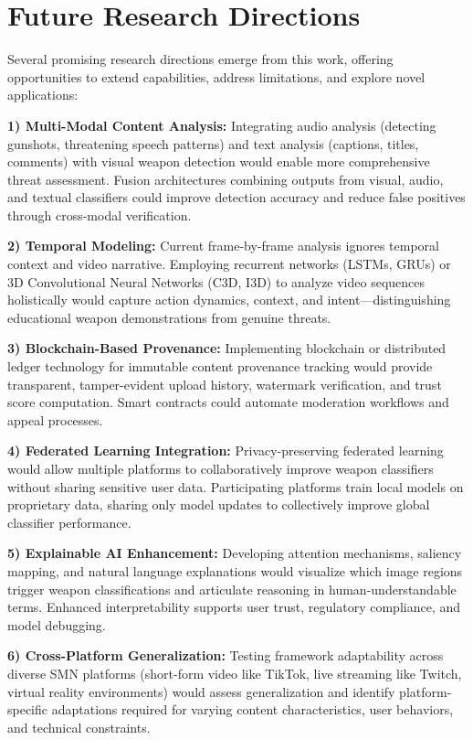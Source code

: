 \documentclass[conference]{IEEEtran}
\begin{document}
\section{Future Research Directions}

Several promising research directions emerge from this work, offering opportunities to extend capabilities, address limitations, and explore novel applications:

\textbf{1) Multi-Modal Content Analysis:} Integrating audio analysis (detecting gunshots, threatening speech patterns) and text analysis (captions, titles, comments) with visual weapon detection would enable more comprehensive threat assessment. Fusion architectures combining outputs from visual, audio, and textual classifiers could improve detection accuracy and reduce false positives through cross-modal verification.

\textbf{2) Temporal Modeling:} Current frame-by-frame analysis ignores temporal context and video narrative. Employing recurrent networks (LSTMs, GRUs) or 3D Convolutional Neural Networks (C3D, I3D) to analyze video sequences holistically would capture action dynamics, context, and intent—distinguishing educational weapon demonstrations from genuine threats.

\textbf{3) Blockchain-Based Provenance:} Implementing blockchain or distributed ledger technology for immutable content provenance tracking would provide transparent, tamper-evident upload history, watermark verification, and trust score computation. Smart contracts could automate moderation workflows and appeal processes.

\textbf{4) Federated Learning Integration:} Privacy-preserving federated learning would allow multiple platforms to collaboratively improve weapon classifiers without sharing sensitive user data. Participating platforms train local models on proprietary data, sharing only model updates to collectively improve global classifier performance.

\textbf{5) Explainable AI Enhancement:} Developing attention mechanisms, saliency mapping, and natural language explanations would visualize which image regions trigger weapon classifications and articulate reasoning in human-understandable terms. Enhanced interpretability supports user trust, regulatory compliance, and model debugging.

\textbf{6) Cross-Platform Generalization:} Testing framework adaptability across diverse SMN platforms (short-form video like TikTok, live streaming like Twitch, virtual reality environments) would assess generalization and identify platform-specific adaptations required for varying content characteristics, user behaviors, and technical constraints.
\end{document}
